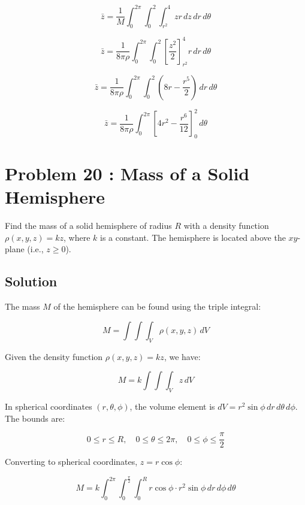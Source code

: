 \documentclass{article}
\begin{document}
\[
\bar{z} = \frac{1}{M} \int_{0}^{2\pi} \int_{0}^{2} \int_{r^2}^{4} z r \, dz \, dr \, d\theta
\]




\[
\bar{z} = \frac{1}{8\pi\rho} \int_{0}^{2\pi} \int_{0}^{2} \left[ \frac{z^2}{2} \right]_{r^2}^{4} r \, dr \, d\theta
\]




\[
\bar{z} = \frac{1}{8\pi\rho} \int_{0}^{2\pi} \int_{0}^{2} \left( 8r - \frac{r^5}{2} \right) \, dr \, d\theta
\]




\[
\bar{z} = \frac{1}{8\pi\rho} \int_{0}^{2\pi} \left[ 4r^2 - \frac{r^6}{12} \right]_0^2 \, d\theta
\]


\]


\]


\]


\]


\]

\section*{Problem 20 : Mass of a Solid Hemisphere}
Find the mass of a solid hemisphere of radius \( R \) with a density function \( \rho(x, y, z) = kz \), where \( k \) is a constant. The hemisphere is located above the \( xy \)-plane (i.e., \( z \geq 0 \)).

\subsection*{Solution}
The mass \( M \) of the hemisphere can be found using the triple integral:


\[
M = \int \int \int_{V} \rho(x, y, z) \, dV
\]


Given the density function \( \rho(x, y, z) = kz \), we have:


\[
M = k \int \int \int_{V} z \, dV
\]



In spherical coordinates \((r, \theta, \phi)\), the volume element is \( dV = r^2 \sin \phi \, dr \, d\theta \, d\phi \). The bounds are:


\[
0 \leq r \leq R, \quad 0 \leq \theta \leq 2\pi, \quad 0 \leq \phi \leq \frac{\pi}{2}
\]



Converting to spherical coordinates, \( z = r \cos \phi \):


\[
M = k \int_{0}^{2\pi} \int_{0}^{\frac{\pi}{2}} \int_{0}^{R} r \cos \phi \cdot r^2 \sin \phi \, dr \, d\phi \, d\theta
\]
\end{document}
